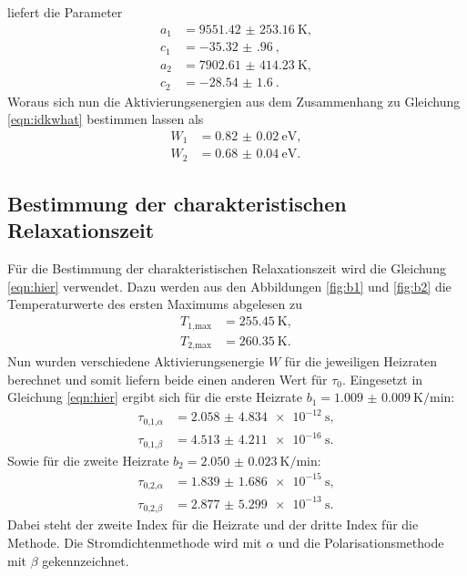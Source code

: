 liefert die Parameter
\begin{align*}
    a_1 &= \SI{9551.42(25316)}{\kelvin},\\
    c_1&= \SI{-35.32(96)}{},\\
    a_2 &= \SI{7902.61(41423)}{\kelvin},\\
    c_2&= \SI{-28.54(160)}{}.
\end{align*}
Woraus sich nun die Aktivierungsenergien aus dem Zusammenhang zu Gleichung \eqref{eqn:idkwhat} bestimmen lassen als
\begin{align}
    W_1 &= \SI{0.82(2)}{\electronvolt},\\
    W_2 &= \SI{0.68(4)}{\electronvolt}.
\end{align}
 
\subsection{Bestimmung der charakteristischen Relaxationszeit}
Für die Bestimmung der charakteristischen Relaxationszeit wird die Gleichung \eqref{eqn:hier} verwendet. Dazu werden aus den Abbildungen \ref{fig:b1} und \ref{fig:b2} die 
Temperaturwerte des ersten Maximums abgelesen zu
\begin{align}
    T_{1\text{,max}} &= \SI{255.45}{\kelvin},\\
    T_{2\text{,max}}&= \SI{260.35}{\kelvin}.
\end{align}
Nun wurden verschiedene Aktivierungsenergie $W$ für die jeweiligen Heizraten berechnet und somit liefern beide einen anderen Wert für $\tau_0$.
Eingesetzt in Gleichung \eqref{eqn:hier} ergibt sich für die erste Heizrate $ b_1 = \SI{1.009(9)}{\kelvin\per\minute}$:
\begin{align}
    \tau_{0\text{,}1\text{,}\alpha} &= \SI{2.058(4834)e-12}{\second},\\
    \tau_{0\text{,}1\text{,}\beta} &= \SI{4.513(4211)e-16}{\second}.
\end{align}
Sowie für die zweite Heizrate $b_2 = \SI{2.050(23)}{\kelvin\per\minute}$: 
\begin{align}
    \tau_{0\text{,}2\text{,}\alpha} &= \SI{1.839(1686)e-15}{\second},\\
    \tau_{0\text{,}2\text{,}\beta} &= \SI{2.877(5299)e-13}{\second}.
\end{align}
Dabei steht der zweite Index für die Heizrate und der dritte Index für die Methode. Die Stromdichtenmethode wird mit $\alpha$ und die Polarisationsmethode mit $\beta$
gekennzeichnet.

